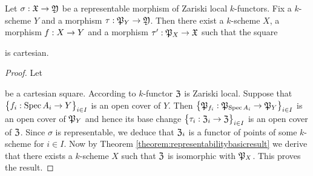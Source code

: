 \begin{proposition}\label{proposition:representablearerepresentableafterarbitrarybasechange}
Let $\sigma:{\mathfrak X}\rightarrow {\mathfrak Y}$ be a representable morphism of Zariski local $k$-functors. Fix a $k$-scheme $Y$ and a morphism $\tau:{\mathfrak P}_Y\rightarrow {\mathfrak Y}$. Then there exist a $k$-scheme $X$, a morphism $f:X\rightarrow Y$ and a morphism $\tau':{\mathfrak P}_X\rightarrow {\mathfrak X}$ such that the square
\begin{center}
\end{center}
is cartesian.
\end{proposition}
\begin{proof}
Let
\begin{center}
\end{center}
be a cartesian square. According to {\cite[Theorem 2.12]{Sheaves}} $k$-functor ${\mathfrak Z}$ is Zariski local. Suppose that $\big\{f_i:\mathrm{Spec}\, A_i\rightarrow Y\big\}_{i\in I}$ is an open cover of $Y$. Then $\big\{{\mathfrak P}_{f_i}:{\mathfrak P}_{\mathrm{Spec}\, A_i}\rightarrow {\mathfrak P}_Y\big\}_{i\in I}$ is an open cover of ${\mathfrak P}_Y$ and hence its base change $\big\{\tau_i:{\mathfrak Z}_i\rightarrow {\mathfrak Z}\big\}_{i\in I}$ is an open cover of ${\mathfrak Z}$. Since $\sigma$ is representable, we deduce that ${\mathfrak Z}_i$ is a functor of points of some $k$-scheme for $i\in I$. Now by Theorem \ref{theorem:representabilitybasicresult} we derive that there exists a $k$-scheme $X$ such that ${\mathfrak Z}$ is isomorphic with ${\mathfrak P}_X$. This proves the result.
\end{proof}

